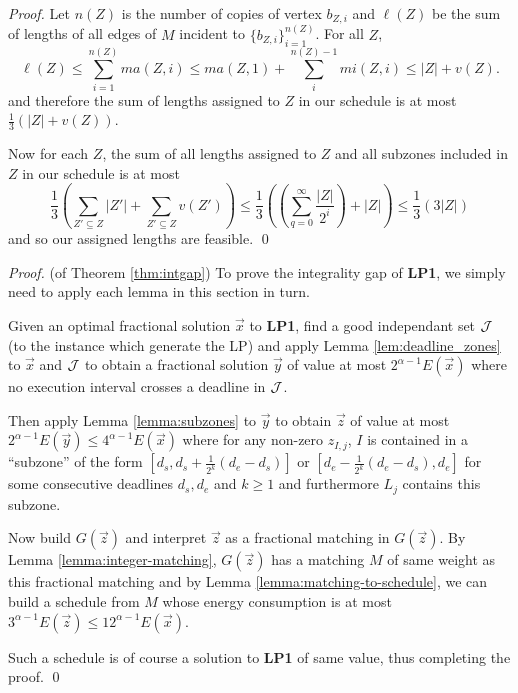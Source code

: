 \begin{proof}
Let $n(Z)$ is the number of copies of vertex $b_{Z,i}$ and $\ell(Z)$ be the sum of lengths of all edges of $M$ incident to $\{b_{Z,i}\}_{i=1}^{n(Z)}$.
For all $Z$,
\[
\ell(Z) \le \sum_{i=1}^{n(Z)} ma(Z,i) \le ma(Z,1) + \sum_{i}^{n(Z)-1} mi(Z,i) \le |Z| + v(Z).
\]
and therefore the sum of lengths assigned to $Z$ in our schedule is at most $\frac{1}{3}(|Z| + v(Z))$.


Now for each $Z$, the sum of all lengths assigned to $Z$ and all subzones included in $Z$ in our schedule is at most
\[
\frac{1}{3}\left(\sum_{Z' \subseteq Z} |Z'|+ \sum_{Z' \subseteq Z} v(Z')\right) \le \frac{1}{3}\left(\left(\sum_{q=0}^\infty \frac{|Z|}{2^i}\right) + |Z|\right) \le \frac{1}{3}(3|Z|)
\]
and so our assigned lengths are feasible.
\qed\end{proof}

\begin{proof}(of Theorem \ref{thm:intgap})
  To prove the integrality gap of \textbf{LP1}, we simply need to apply each lemma in this section in turn.

  Given an optimal fractional solution $\vec{x}$ to \textbf{LP1}, find a good independant set $\cal{J}$ (to the instance which generate the LP) and apply Lemma \ref{lem:deadline_zones} to $\vec{x}$ and $\cal{J}$ to obtain a fractional solution $\vec{y}$ of value at most $2^{\alpha-1}E(\vec{x})$ where no execution interval crosses a deadline in $\cal{J}$.

  Then apply Lemma \ref{lemma:subzones} to $\vec{y}$ to obtain $\vec{z}$ of value at most $2^{\alpha-1}E(\vec{y}) \le 4^{\alpha-1}E(\vec{x})$ where for any non-zero $z_{I,j}$, $I$ is contained in a ``subzone'' of the form $[d_s, d_s + \frac{1}{2^{k}}(d_e-d_s)]$ or $[d_e - \frac{1}{2^{k}}(d_e-d_s), d_e ]$ for some consecutive deadlines $d_s, d_e$ and $k \ge 1$ and furthermore $L_j$ contains this subzone.

  Now build $G(\vec{z})$ and interpret $\vec{z}$ as a fractional matching in $G(\vec{z})$. By Lemma \ref{lemma:integer-matching}, $G(\vec{z})$ has a matching $M$ of same weight as this fractional matching and by Lemma \ref{lemma:matching-to-schedule}, we can build a schedule from $M$ whose energy consumption is at most $3^{\alpha-1}E(\vec{z}) \le 12^{\alpha-1}E(\vec{x})$.

  Such a schedule is of course a solution to \textbf{LP1} of same value, thus completing the proof.
\qed\end{proof}









